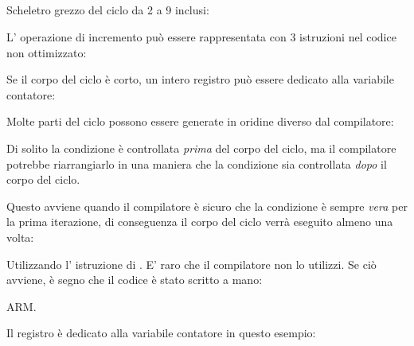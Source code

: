 ﻿%
\subsection{\Conclusion{}}

Scheletro grezzo del ciclo da 2 a 9 inclusi:



L' operazione di incremento può essere rappresentata con 3 istruzioni nel codice non ottimizzato:



Se il corpo del ciclo è corto, un intero registro può essere dedicato alla variabile contatore:



Molte parti del ciclo possono essere generate in oridine diverso dal compilatore:



Di solito la condizione è controllata \emph{prima} del corpo del ciclo, ma il compilatore potrebbe riarrangiarlo in una maniera che la condizione sia controllata 
\emph{dopo} il corpo del ciclo.

Questo avviene quando il compilatore è sicuro che la condizione è sempre \emph{vera} per la prima iterazione, 
di conseguenza il corpo del ciclo verrà eseguito almeno una volta:




Utilizzando l' istruzione di . E' raro che il compilatore non lo utilizzi.
Se ciò avviene, è segno che il codice è stato scritto a mano:



ARM. 

Il registro  è dedicato alla variabile contatore in questo esempio:





